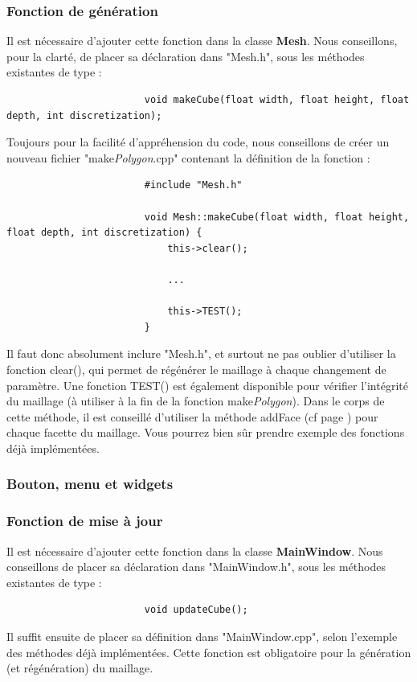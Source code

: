 \documentclass[a4paper]{memoir}
\begin{document}
				\subsubsection{Fonction de génération}
					Il est nécessaire d'ajouter cette fonction dans la classe \textbf{Mesh}. Nous conseillons, pour la clarté, de placer sa déclaration dans 
					"Mesh.h", sous les méthodes existantes de type :
					\begin{verbatim}
						void makeCube(float width, float height, float depth, int discretization);
					\end{verbatim}
					Toujours pour la facilité d'appréhension du code, nous conseillons de créer un nouveau fichier "make\textit{Polygon}.cpp" contenant la 
					définition de la fonction :
					\begin{verbatim}
						#include "Mesh.h"

						void Mesh::makeCube(float width, float height, float depth, int discretization) {
						    this->clear();
							
						    ...
							
						    this->TEST();
						}
					\end{verbatim}
					Il faut donc absolument inclure "Mesh.h", et surtout ne pas oublier d'utiliser la fonction clear(), qui permet de régénérer le maillage à
					chaque changement de paramètre. Une fonction TEST() est également disponible pour vérifier l'intégrité du maillage (à utiliser à la fin 
					de la fonction make\textit{Polygon}). Dans le corps de cette méthode, il est conseillé d'utiliser la méthode addFace (cf page 
					\pageref{mesh-dev}) pour chaque facette du maillage. Vous pourrez bien sûr prendre exemple des fonctions déjà implémentées.
					
				\subsubsection{Bouton, menu et widgets}
					
				\subsubsection{Fonction de mise à jour}
					Il est nécessaire d'ajouter cette fonction dans la classe \textbf{MainWindow}. Nous conseillons de placer sa déclaration dans 
					"MainWindow.h", sous les méthodes existantes de type :
					\begin{verbatim}
						void updateCube();
					\end{verbatim}
					Il suffit ensuite de placer sa définition dans "MainWindow.cpp", selon l'exemple des méthodes déjà implémentées. Cette fonction est 
					obligatoire pour la génération (et régénération) du maillage.
				
\end{document}
